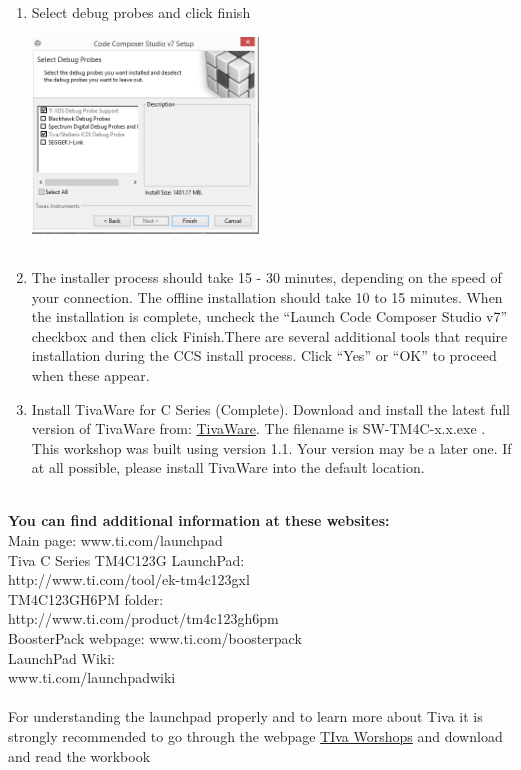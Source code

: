\documentclass[a4paper,12pt,oneside]{article}
\begin{document}
{\begin{enumerate}
					\item Select debug probes and click finish \\
							{\centering
							\includegraphics[width=6cm, height=6cm]{Images/CCSInstall4}}
					\item The installer process	should take 15 - 30 minutes, depending on the speed of your connection. The offline
					installation should take 10 to 15 minutes. When the installation is complete, uncheck the
					“Launch Code Composer Studio v7” checkbox and then click Finish.There are several additional tools that require installation during the CCS install process. Click “Yes” or “OK” to proceed when these appear. \\
					\item Install TivaWare for C Series (Complete). Download and install the latest full version of TivaWare from: \href{http://www.ti.com/tool/sw-tm4c}{TivaWare}. The filename is SW-TM4C-x.x.exe . This
					workshop was built using version 1.1. Your version may be a later one. If at all possible,
					please install TivaWare into the default location.
				\end{enumerate}}
				{\large \textbf{\\You can find additional information at these websites:}\\
				Main page: www.ti.com/launchpad\\
				Tiva C Series TM4C123G LaunchPad:\\ http://www.ti.com/tool/ek-tm4c123gxl\\
				TM4C123GH6PM folder:\\ http://www.ti.com/product/tm4c123gh6pm\\
				BoosterPack webpage: www.ti.com/boosterpack\\
				LaunchPad Wiki:\\ www.ti.com/launchpadwiki\\}	\\	
				{\Large For understanding the launchpad properly and to learn more about Tiva it is strongly recommended to go through the webpage \href{http://processors.wiki.ti.com/index.php/Getting_Started_with_the_TIVA\%E2\%84\%A2_C_Series_TM4C123G_LaunchPad}{TIva Worshops} and download and read the workbook }
\end{document}
